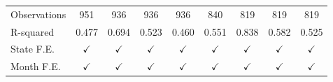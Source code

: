 \begin{tabular}{lcccccccc}
\arrayrulecolor{black!10}\midrule
Observations        &         951         &         936         &         936         &         936         &         840         &         819         &         819         &         819         \\
R-squared           &       0.477         &       0.694         &       0.523         &       0.460         &       0.551         &       0.838         &       0.582         &       0.525         \\
State F.E.          &$\checkmark$         &$\checkmark$         &$\checkmark$         &$\checkmark$         &$\checkmark$         &$\checkmark$         &$\checkmark$         &$\checkmark$         \\
Month F.E.          &$\checkmark$         &$\checkmark$         &$\checkmark$         &$\checkmark$         &$\checkmark$         &$\checkmark$         &$\checkmark$         &$\checkmark$         \\



\end{tabular}
